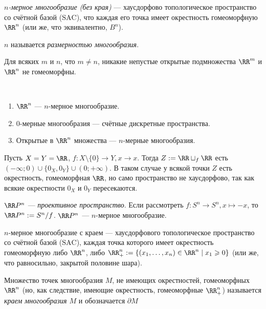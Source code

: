\documentclass[12pt,a4paper]{article}
\newcommand{\SAC}{\ensuremath{\mathrm{SAC}}\xspace}
\begin{document}
    \begin{definition}
        \emph{$n$-мерное многообразие (без края)} --- хаусдорфово топологическое пространство со счётной базой (\SAC), что каждая его точка имеет окрестность гомеоморфную $\RR^n$ (или же, что эквивалентно, $B^n$).

        $n$ называется \emph{размерностью многообразия}.
    \end{definition}

    \begin{theorem}
        Для всяких $m$ и $n$, что $m \neq n$, никакие непустые открытые подмножества $\RR^m$ и $\RR^n$ не гомеоморфны.
    \end{theorem}

    \begin{example}\ 
        \begin{enumerate}
            \item $\RR^n$ --- $n$-мерное многообразие.
            \item $0$-мерные многообразия --- счётные дискретные пространства.
            \item Открытые в $\RR^n$ множества --- $n$-мерные многообразия.
        \end{enumerate}
    \end{example}

    \begin{example}
        Пусть $X = Y = \RR$, $f: X \setminus \{0\} \to Y, x \to x$. Тогда $Z := \RR \sqcup_f \RR$ есть $(-\infty; 0) \cup \{0_X, 0_Y\} \cup (0; +\infty)$. В таком случае у всякой точки $Z$ есть окрестность, гомеоморфная $\RR$, но само пространство не хаусдорфово, так как всякие окрестности $0_X$ и $0_Y$ пересекаются.
    \end{example}

    \begin{example}
        $\RR P^n$ --- \emph{проективное пространство}. Если рассмотреть $f: S^n \to S^n, x \mapsto -x$, то $\RR P^n := S^n/f$. $\RR P^n$ --- $n$-мерное многообразие.
    \end{example}

    \begin{definition}
        $n$-мерное многообразие с краем --- хаусдорфового топологическое пространство со счётной базой (\SAC), каждая точка которого имеет окрестность гомеоморфную либо $\RR^n$, либо $\RR^n_+ := \{(x_1, \dots, x_n) \in \RR^n \mid x_1 \geqslant 0\}$ (или же, что равносильно, закрытой половине шара).

        Множество точек многообразия $M$, не имеющих окрестностей, гомеоморфных $\RR^n$ (но, как следствие, имеющие окрестность, гомеоморфные $\RR^n_+$) называется \emph{краем многообразия $M$} и обозначается $\partial M$
    \end{definition}
\end{document}

